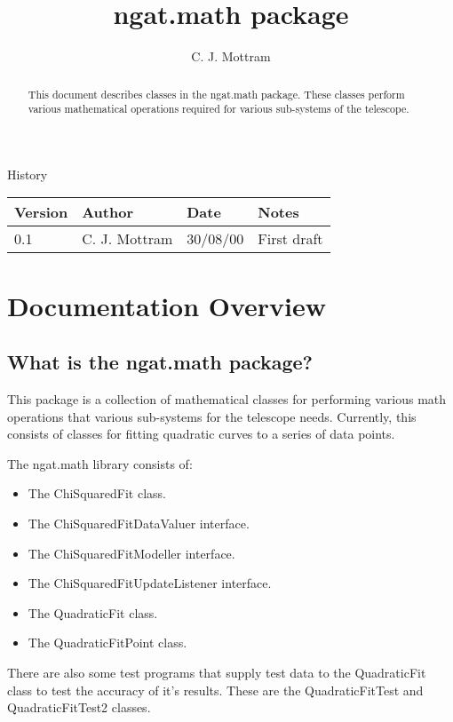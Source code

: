 \documentclass[10pt,a4paper]{article}
\title{ngat.math package}
\author{C. J. Mottram}
\date{}
\begin{document}
\thispagestyle{empty}
\maketitle
\begin{abstract}
This document describes classes in the ngat.math package.
These classes perform various mathematical operations required for various sub-systems of the telescope.
\end{abstract}

\centerline{\Large History}
\begin{center}
\begin{tabular}{|l|l|l|p{15em}|}
\hline
{\bf Version} & {\bf Author} & {\bf Date} & {\bf Notes} \\
\hline
0.1 &              C. J. Mottram & 30/08/00 & First draft \\
\hline
\end{tabular}
\end{center}

\newpage
\tableofcontents
\listoffigures
\listoftables
\newpage

\section{Documentation Overview}
\subsection{What is the ngat.math package?}
This package is a collection of mathematical classes for performing various math operations that various
sub-systems for the telescope needs. Currently, this consists of classes for fitting quadratic curves
to a series of data points.

The ngat.math library consists of:
\begin{itemize}
\item The ChiSquaredFit class.
\item The ChiSquaredFitDataValuer interface.
\item The ChiSquaredFitModeller interface.
\item The ChiSquaredFitUpdateListener interface.
\item The QuadraticFit class.
\item The QuadraticFitPoint class.
\end{itemize}

There are also some test programs that supply test data to the QuadraticFit class to test the accuracy of it's
results. These are the QuadraticFitTest and QuadraticFitTest2 classes.
\end{document}
